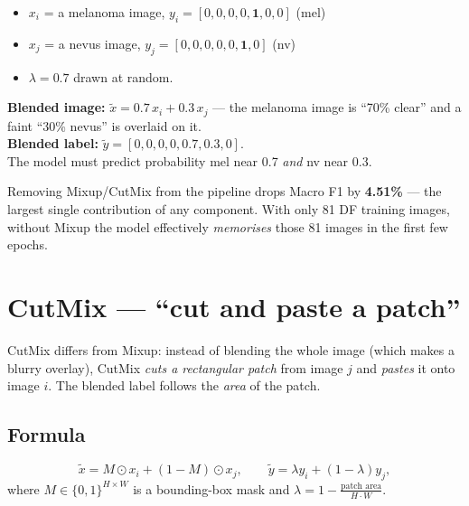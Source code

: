 \documentclass[11pt,a4paper]{article}
\begin{document}
\begin{example}
\begin{itemize}[leftmargin=*]
  \item $x_i$ = a melanoma image, $y_i = [0,0,0,0,\mathbf{1},0,0]$ (mel)
  \item $x_j$ = a nevus image, $y_j = [0,0,0,0,0,\mathbf{1},0]$ (nv)
  \item $\lambda = 0.7$ drawn at random.
\end{itemize}
\textbf{Blended image:} $\tilde{x} = 0.7 \, x_i + 0.3 \, x_j$ --- the melanoma image is ``70\% clear'' and a faint ``30\% nevus'' is overlaid on it.\\
\textbf{Blended label:} $\tilde{y} = [0,0,0,0, \mathbf{0.7}, \mathbf{0.3}, 0]$.\\
The model must predict probability mel near 0.7 \textit{and} nv near 0.3.
\end{example}

\begin{idea}
Removing Mixup/CutMix from the pipeline drops Macro F1 by \textbf{4.51\%} --- the largest single contribution of any component. With only 81 DF training images, without Mixup the model effectively \textit{memorises} those 81 images in the first few epochs.
\end{idea}

\section{CutMix --- ``cut and paste a patch''}

\begin{simple}
CutMix differs from Mixup: instead of blending the whole image (which makes a blurry overlay), CutMix \textit{cuts a rectangular patch} from image $j$ and \textit{pastes} it onto image $i$. The blended label follows the \textit{area} of the patch.
\end{simple}

\subsection{Formula}

\[
  \tilde{x} = M \odot x_i + (1-M) \odot x_j, \qquad \tilde{y} = \lambda y_i + (1-\lambda) y_j,
\]
where $M \in \{0,1\}^{H\times W}$ is a bounding-box mask and $\lambda = 1 - \frac{\text{patch area}}{H \cdot W}$.
\end{document}
